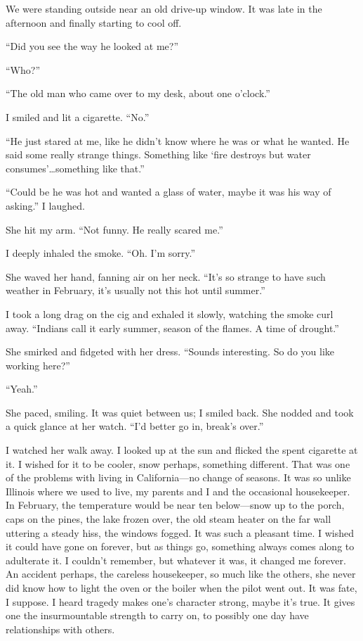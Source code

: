 We were standing outside near an old drive-up window. It was late in the
afternoon and finally starting to cool off.

``Did you see the way he looked at me?''

``Who?''

``The old man who came over to my desk, about one o'clock.''

I smiled and lit a cigarette. ``No.''

``He just stared at me, like he didn't know where he was or what he
wanted. He said some really strange things. Something like `fire
destroys but water consumes'\ldots something like that.''

``Could be he was hot and wanted a glass of water, maybe it was his way
of asking.'' I laughed.

She hit my arm. ``Not funny. He really scared me.''

I deeply inhaled the smoke. ``Oh. I'm sorry.''

She waved her hand, fanning air on her neck. ``It's so strange to have
such weather in February, it's usually not this hot until summer.''

I took a long drag on the cig and exhaled it slowly, watching the smoke
curl away. ``Indians call it early summer, season of the flames. A time
of drought.''

She smirked and fidgeted with her dress. ``Sounds interesting. So do you
like working here?''

``Yeah.''

She paced, smiling. It was quiet between us; I smiled back. She nodded
and took a quick glance at her watch. ``I'd better go in, break's
over.''

I watched her walk away. I looked up at the sun and flicked the spent
cigarette at it. I wished for it to be cooler, snow perhaps, something
different. That was one of the problems with living in California---no
change of seasons. It was so unlike Illinois where we used to live, my
parents and I and the occasional housekeeper. In February, the
temperature would be near ten below---snow up to the porch, caps on the
pines, the lake frozen over, the old steam heater on the far wall
uttering a steady hiss, the windows fogged. It was such a pleasant time.
I wished it could have gone on forever, but as things go, something
always comes along to adulterate it. I couldn't remember, but whatever
it was, it changed me forever. An accident perhaps, the careless
housekeeper, so much like the others, she never did know how to light
the oven or the boiler when the pilot went out. It was fate, I suppose.
I heard tragedy makes one's character strong, maybe it's true. It gives
one the insurmountable strength to carry on, to possibly one day have
relationships with others.

